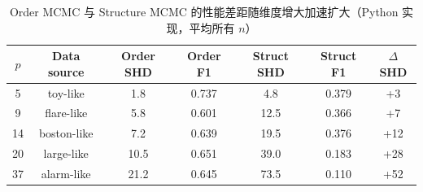 \begin{table}[htbp]
\centering
\caption{Order MCMC 与 Structure MCMC 的性能差距随维度增大加速扩大（Python 实现，平均所有 $n$）}
\label{tab:order_vs_structure}
\begin{tabular}{c c c c c c c}
\toprule
$p$ & Data source & Order SHD & Order F1 & Struct SHD & Struct F1 & $\Delta$SHD \\
\midrule
5 & toy-like & 1.8 & 0.737 & 4.8 & 0.379 & +3 \\
9 & flare-like & 5.8 & 0.601 & 12.5 & 0.366 & +7 \\
14 & boston-like & 7.2 & 0.639 & 19.5 & 0.376 & +12 \\
20 & large-like & 10.5 & 0.651 & 39.0 & 0.183 & +28 \\
37 & alarm-like & 21.2 & 0.645 & 73.5 & 0.110 & +52 \\
\bottomrule
\end{tabular}
\end{table}
